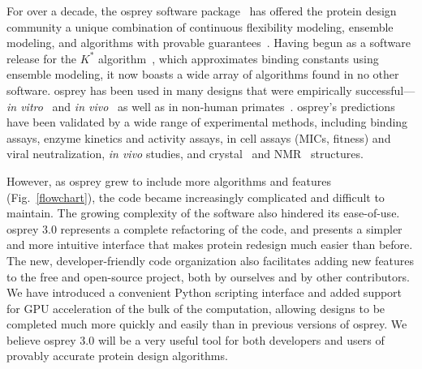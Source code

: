 For over a decade, the {\sc osprey} software package~\cite{OSPREY_MIE,minDEE,OSPREY_MIE,OSPREY} has offered the protein design community a unique combination of continuous flexibility modeling, ensemble modeling, and algorithms with provable guarantees~\cite{alg_SMB_textbook,cosb_design}.  Having begun as a software release for the $K^*$ algorithm~\cite{minDEE,GrsA-LeuA}, which approximates binding constants using ensemble modeling, it now boasts a wide array of algorithms found in no other software.  {\sc osprey} has been used in many designs that were empirically successful---\textit{in vitro}~\cite{VRC07_enhance,CFTR,runx1_cbfb,GrsA-LeuA,DHFR-PNAS,GrsA-TyrA,specific_probes} and \textit{in vivo}~\cite{VRC07_enhance,CFTR,runx1_cbfb,DHFR-PNAS} as well as in non-human primates~\cite{VRC07_enhance}.  {\sc osprey}'s predictions have been validated by a wide range of experimental methods, including binding assays, enzyme kinetics and activity assays, in cell assays (MICs, fitness) and viral neutralization, {\em in vivo} studies, and crystal~\cite{DHFR-PNAS2, VRC07_enhance} and NMR~\cite{runx1_cbfb} structures.    

However, as {\sc osprey} grew to include more algorithms and features (Fig.~\ref{flowchart}), the code became increasingly complicated and difficult to maintain.  The growing complexity of the software also hindered its ease-of-use. {\sc osprey} 3.0 represents a complete refactoring of the code, and presents a simpler and more intuitive interface that makes protein redesign much easier than before. The new, developer-friendly code organization also facilitates adding new features to the free and open-source \osprey project, both by ourselves and by other contributors.  We have introduced a convenient Python scripting interface and added support for GPU acceleration of the bulk of the computation, allowing designs to be completed much more quickly and easily than in previous versions of {\sc osprey}.  We believe {\sc osprey} 3.0 will be a very useful tool for both developers and users of provably accurate protein design algorithms.  


